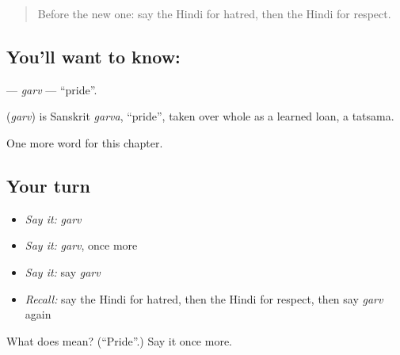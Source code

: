 \begin{quote}
Before the new one: say the Hindi for hatred, then the Hindi for respect.
\end{quote}

\subsection*{You'll want to know: }
\textbf{} — \emph{garv} — \textquotedblleft{}pride\textquotedblright{}.

\begin{cousinweb}
\textbf{} (\emph{garv}) is Sanskrit \emph{garva}, \textquotedblleft{}pride\textquotedblright{}, taken over whole as a learned loan, a tatsama.
\end{cousinweb}

\begin{grammarlens}[title={What you've built}]
One more word for this chapter.
\end{grammarlens}

\subsection*{Your turn}
\begin{itemize}
\raggedright
  \item \emph{Say it:} \emph{garv}
  \item \emph{Say it:} \emph{garv}, once more
  \item \emph{Say it:} say \emph{garv}
  \item \emph{Recall:} say the Hindi for hatred, then the Hindi for respect, then say \emph{garv} again
\end{itemize}

\begin{tcolorbox}[breakable,colback=teal!4,colframe=teal!35!black,title={Before you move on}]
What does  mean? (\textquotedblleft{}Pride\textquotedblright{}.) Say it once more.
\end{tcolorbox}
